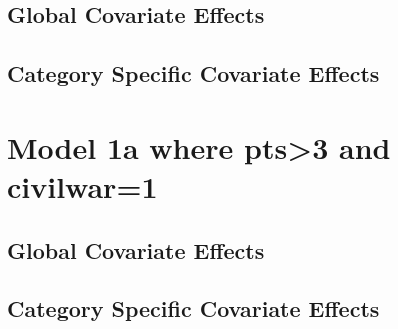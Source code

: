 \documentclass[]{article}
\begin{document}
\subsection{Global Covariate Effects}

\clearpage
\subsection{Category Specific Covariate Effects}

\clearpage


\section{Model 1a where pts>3 and civilwar=1}
\subsection{Global Covariate Effects}

\clearpage
\subsection{Category Specific Covariate Effects}

\clearpage
\end{document}
